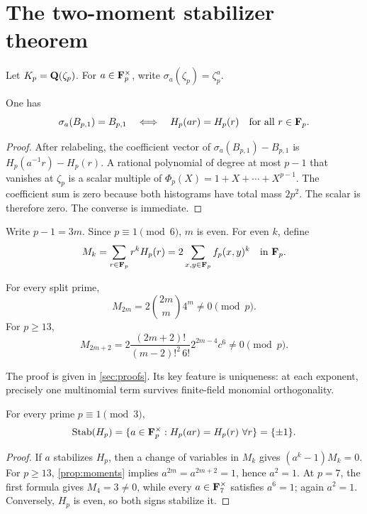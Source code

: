\section{The two-moment stabilizer theorem}

Let $K_p=\mathbf Q(\zeta_p)$.  For $a\in\mathbf F_p^\times$, write
$\sigma_a(\zeta_p)=\zeta_p^a$.

\begin{lemma}\label{lem:dictionary}
One has
\[
 \sigma_a(B_{p,1})=B_{p,1}
 \quad\Longleftrightarrow\quad
 H_p(ar)=H_p(r)\quad\text{for all }r\in\mathbf F_p.
\]
\end{lemma}

\begin{proof}
After relabeling, the coefficient vector of
$\sigma_a(B_{p,1})-B_{p,1}$ is
$H_p(a^{-1}r)-H_p(r)$.  A rational polynomial of degree at most $p-1$
that vanishes at $\zeta_p$ is a scalar multiple of
$\Phi_p(X)=1+X+\cdots+X^{p-1}$.  The coefficient sum is zero because both
histograms have total mass $2p^2$.  The scalar is therefore zero.  The
converse is immediate.
\end{proof}

Write $p-1=3m$.  Since $p\equiv1\pmod6$, $m$ is even.  For even $k$, define
\[
 M_k=\sum_{r\in\mathbf F_p}r^kH_p(r)
     =2\sum_{x,y\in\mathbf F_p}f_p(x,y)^k\quad\text{in }\mathbf F_p.
\]

\begin{proposition}\label{prop:moments}
For every split prime,
\[
 M_{2m}=2\binom{2m}{m}4^m\ne0\pmod p.
\]
For $p\ge13$,
\[
 M_{2m+2}
 =2\frac{(2m+2)!}{(m-2)!^2\,6!}
   2^{2m-4}c^6\ne0\pmod p.
\]
\end{proposition}

The proof is given in \cref{sec:proofs}.  Its key feature is uniqueness: at
each exponent, precisely one multinomial term survives finite-field monomial
orthogonality.

\begin{theorem}\label{thm:stabilizer}
For every prime $p\equiv1\pmod3$,
\[
 \Stab(H_p)=\{a\in\F_p^\times:H_p(ar)=H_p(r)\ \forall r\}
             =\{\pm1\}.
\]
\end{theorem}

\begin{proof}
If $a$ stabilizes $H_p$, then a change of variables in $M_k$ gives
$(a^k-1)M_k=0$.  For $p\ge13$, \cref{prop:moments} implies
$a^{2m}=a^{2m+2}=1$, hence $a^2=1$.  At $p=7$, the first formula gives
$M_4=3\ne0$, while every $a\in\mathbf F_7^\times$ satisfies $a^6=1$; again
$a^2=1$.  Conversely, $H_p$ is even, so both signs stabilize it.
\end{proof}
